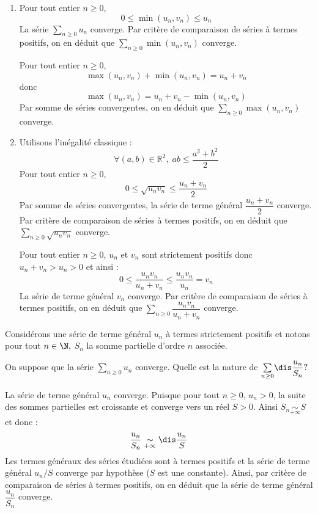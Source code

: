 \documentclass[a4paper,10pt]{report}
\newcommand{\Sum}[2]{\ensuremath{\textstyle{\sum\limits_{#1}^{#2}}}}
\begin{document}
\newpage

\corr  

\begin{enumerate}
\item Pour tout entier $n \geq 0$,
$$ 0 \leq  \min(u_n,v_n) \leq u_n $$
La série $\Sum{n \geq 0}{} u_n$ converge. Par critère de comparaison de séries à termes positifs, on en déduit que $\Sum{n \geq 0}{} \min(u_n,v_n)$ converge. 

\medskip

\noindent Pour tout entier $n \geq 0$,
$$  \max(u_n,v_n) + \min(u_n,v_n) = u_n + v_n $$
donc 
$$ \max(u_n,v_n) =   u_n + v_n - \min(u_n,v_n)$$
Par somme de séries convergentes, on en déduit que $\Sum{n \geq 0}{} \max(u_n,v_n)$ converge.
\item Utilisons l'inégalité classique :
$$ \forall (a,b) \in \mathbb{R}^2, \; ab \leq \dfrac{a^2+b^2}{2}$$
Pour tout entier $n \geq 0$,
$$ 0 \leq \sqrt{u_n v_n} \leq \dfrac{u_n+ v_n}{2}$$
Par somme de séries convergentes, la série de terme général $\dfrac{u_n+ v_n}{2}$ converge. Par critère de comparaison de séries à termes positifs, on en déduit que $\Sum{n \geq 0}{} \sqrt{u_n v_n}$ converge. 

\medskip

\noindent Pour tout entier $n \geq 0$, $u_n$ et $v_n$ sont strictement positifs donc $u_n+v_n > u_n >0$ et ainsi :
$$ 0 \leq \dfrac{u_n v_n}{u_n+v_n} \leq \dfrac{u_n v_n}{u_n} = v_n$$
La série de terme général $v_n$ converge. Par critère de comparaison de séries à termes positifs, on en déduit que $\Sum{n \geq 0}{} \dfrac{u_n v_n}{u_n+v_n}$ converge. 
\end{enumerate}

\medskip

\begin{Exercice}{} Considérons une série de terme général $u_n$ à termes strictement positifs et notons pour tout $n\in\N,$ $S_n$ la somme partielle d'ordre $n$ associée. 

On suppose que la s\'erie $\Sum{n \geq 0}{} u_n$ converge. Quelle est la nature de $\Sum{n \geq 0}{} \dis \dfrac{u_n}{S_n}?$
\end{Exercice}

\corr La s\'erie de terme général $u_n$ converge. Puisque pour tout $n \geq 0$, $u_n>0$, la suite des sommes partielles est croissante et converge vers un réel $S>0.$ Ainsi $S_n \underset{+ \infty}{\sim} S$ et donc :
$$\frac{u_n}{S_n}\underset{+ \infty}{\sim} \dis\frac{u_n}{S}$$
Les termes généraux des séries étudiées sont à termes positifs et la s\'erie de terme général $u_n/S$ converge par hypothèse ($S$ est une constante). Ainsi, par critère de comparaison de séries à termes positifs, on en déduit que la s\'erie de terme général $\dfrac{u_n}{S_n}$ converge.
\end{document}
